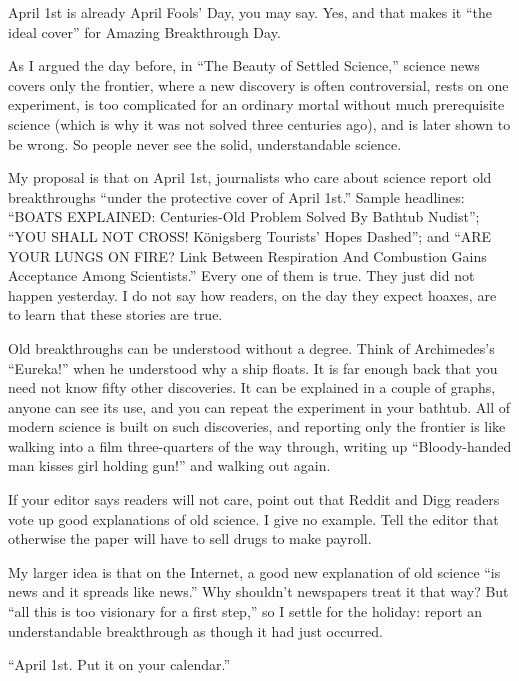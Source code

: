 
April 1st is already April Fools' Day, you may say. Yes, and that makes it ``the ideal cover'' for Amazing Breakthrough Day.

As I argued the day before, in ``The Beauty of Settled Science,'' science news covers only the frontier, where a new discovery is often controversial, rests on one experiment, is too complicated for an ordinary mortal without much prerequisite science (which is why it was not solved three centuries ago), and is later shown to be wrong. So people never see the solid, understandable science. 

My proposal is that on April 1st, journalists who care about science report old breakthroughs ``under the protective cover of April 1st.'' Sample headlines: ``BOATS EXPLAINED: Centuries-Old Problem Solved By Bathtub Nudist''; ``YOU SHALL NOT CROSS! Königsberg Tourists' Hopes Dashed''; and ``ARE YOUR LUNGS ON FIRE? Link Between Respiration And Combustion Gains Acceptance Among Scientists.'' Every one of them is true. They just did not happen yesterday. I do not say how readers, on the day they expect hoaxes, are to learn that these stories are true.

Old breakthroughs can be understood without a degree. Think of Archimedes's ``Eureka!'' when he understood why a ship floats. It is far enough back that you need not know fifty other discoveries. It can be explained in a couple of graphs, anyone can see its use, and you can repeat the experiment in your bathtub.  All of modern science is built on such discoveries, and reporting only the frontier is like walking into a film three-quarters of the way through, writing up ``Bloody-handed man kisses girl holding gun!'' and walking out again.

If your editor says readers will not care, point out that Reddit and Digg readers vote up good explanations of old science. I give no example. Tell the editor that otherwise the paper will have to sell drugs to make payroll.

My larger idea is that on the Internet, a good new explanation of old science ``is news and it spreads like news.'' Why shouldn't newspapers treat it that way? But ``all this is too visionary for a first step,'' so I settle for the holiday: report an understandable breakthrough as though it had just occurred. 

``April 1st. Put it on your calendar.''
